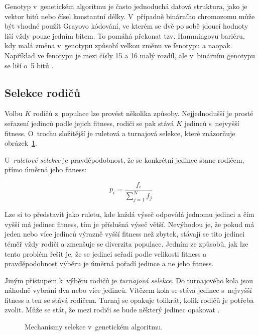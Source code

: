 Genotyp v~genetickém algoritmu je často jednoduchá datová struktura, jako je vektor bitů nebo čísel konstantní délky. V~případně binárního chromozomu může být vhodné použít Grayovo kódování, ve kterém se dvě po sobě jdoucí hodnoty liší vždy pouze jedním bitem. To pomáhá překonat tzv. Hammingovu bariéru, kdy malá změna v~genotypu způsobí velkou změnu ve fenotypu a naopak. Například ve fenotypu je mezi čísly 15 a 16 malý rozdíl, ale v~binárním genotypu se liší o~5 bitů \cite{HandbookGA}.


\subsection{Selekce rodičů}

Volbu $K$ rodičů z~populace lze provést několika způsoby. Nejjednodušší je prosté seřazení jedinců podle jejich fitness, rodiči se pak stává $K$ jedinců s~nejvyšší fitness. O~trochu složitější je ruletová a turnajová selekce, které znázorňuje obrázek~\ref{obrSelekce}.

U~\emph{ruletové selekce} je pravděpodobnost, že se konkrétní jedinec stane rodičem, přímo úměrná jeho fitness:

\begin{equation}
p_i = \frac{f_i}{\sum_{j=1}^N{f_j}}
\end{equation}

\noindent{}Lze si to představit jako ruletu, kde každá výseč odpovídá jednomu jedinci a čím vyšší má jedinec fitness, tím je příslušná výseč větší. Nevýhodou je, že pokud má jeden nebo více jedinců výrazně vyšší fitness než zbytek, stávají se tito jedinci téměř vždy rodiči a zmenšuje se diverzita populace. Jedním ze způsobů, jak lze tento problém řešit je, že se jedinci seřadí podle velikosti fitness a pravděpodobnost výběru je úměrná pořadí jedince a ne jeho fitness.

Jiným přístupem k~výběru rodičů je \emph{turnajová selekce}. Do turnajového kola jsou náhodně vybráni dva nebo více jedinců. Vítězem kola se stává jedinec s~nejvyšší fitness a ten se stává rodičem. Turnaj se opakuje tolikrát, kolik rodičů je potřeba zvolit. Může se stát, že mezi rodiči se bude některý jedinec opakovat \cite{Modra}.


\begin{figure}[hbt]
    \centering
    \hfill
    \hfill
    \caption{Mechanismy selekce v~genetickém algoritmu.}
    \label{obrSelekce}
\end{figure}




